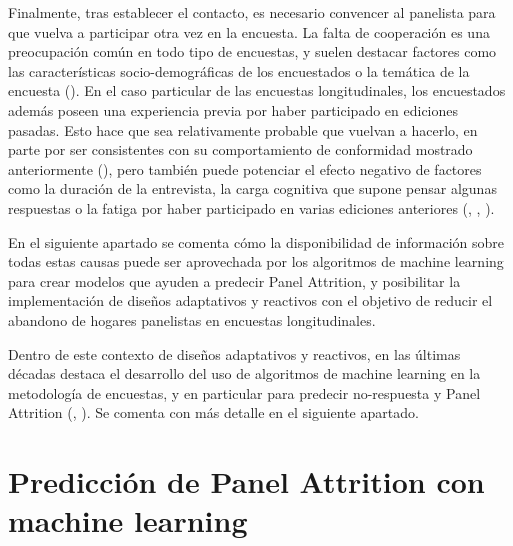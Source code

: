 Finalmente, tras establecer el contacto, es necesario convencer al panelista para que vuelva a participar otra vez en la encuesta. La falta de cooperación es una preocupación común en todo tipo de encuestas, y suelen destacar factores como las características socio-demográficas de los encuestados o la temática de la encuesta (\cite{groves1992understanding}). En el caso particular de las encuestas longitudinales, los encuestados además poseen una experiencia previa por haber participado en ediciones pasadas. Esto hace que sea relativamente probable que vuelvan a hacerlo, en parte por ser consistentes con su comportamiento de conformidad mostrado anteriormente (\cite{groves1992understanding}), pero también puede potenciar el efecto negativo de factores como la duración de la entrevista, la carga cognitiva que supone pensar algunas respuestas o la fatiga por haber participado en varias ediciones anteriores (\cite{laurie1999strategies}, \cite{watson2009identifying}, \cite{lynn2018tackling}).

En el siguiente apartado se comenta cómo la disponibilidad de información sobre todas estas causas puede ser aprovechada por los algoritmos de machine learning para crear modelos que ayuden a predecir Panel Attrition, y posibilitar la implementación de diseños adaptativos y reactivos con el objetivo de reducir el abandono de hogares panelistas en encuestas longitudinales.

Dentro de este contexto de diseños adaptativos y reactivos, en las últimas décadas destaca el desarrollo del uso de algoritmos de machine learning en la metodología de encuestas, y en particular para predecir no-respuesta y Panel Attrition (\cite{buskirk2018introduction}, \cite{kern2019tree}). Se comenta con más detalle en el siguiente apartado.

\section{Predicción de Panel Attrition con machine learning}

